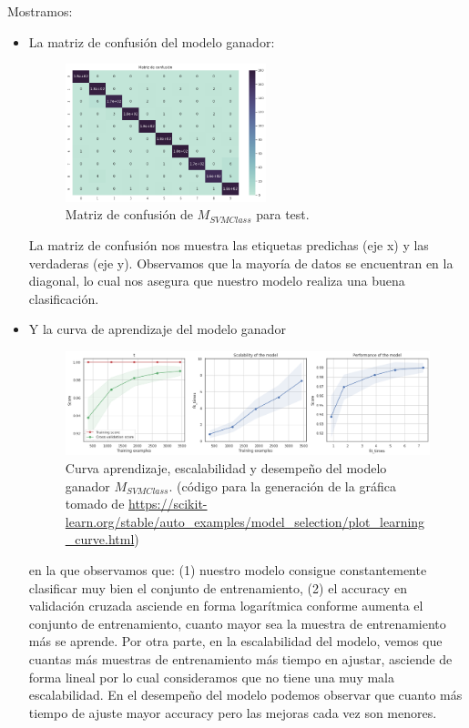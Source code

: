 \documentclass[11pt,a4paper]{article}
\theoremstyle{definition}
\begin{document}
	Mostramos:
	\begin{itemize}
	\item  La matriz de confusión del modelo ganador:
	\begin{figure}[H]
	\centering
	\includegraphics[width=0.55\textwidth]{images/confusion}
	\caption{Matriz de confusión de $M_{SVMClass}$ para test.}
	\end{figure}
	La matriz de confusión nos muestra las etiquetas predichas (eje x) y las verdaderas (eje y). Observamos que la mayoría de datos se encuentran en la diagonal, lo cual nos asegura que nuestro modelo realiza una buena clasificación.\\

	\item Y la curva de aprendizaje del modelo ganador 
	\begin{figure}[H]
	\centering
	\includegraphics[width=1\textwidth]{images/learning_curve}
	\caption{Curva aprendizaje, escalabilidad y desempeño del modelo ganador $M_{SVMClass}$. (código para la generación de la gráfica tomado de \url{https://scikit-learn.org/stable/auto_examples/model_selection/plot_learning_curve.html})}
	\end{figure}
	en la que observamos que: (1) nuestro modelo consigue constantemente clasificar muy bien el conjunto de entrenamiento, (2) el accuracy en validación cruzada asciende en forma logarítmica conforme aumenta el conjunto de entrenamiento, cuanto mayor sea la muestra de entrenamiento más se aprende. Por otra parte, en la escalabilidad del modelo, vemos que cuantas más muestras de entrenamiento más tiempo en ajustar, asciende de forma lineal por lo cual consideramos que no tiene una muy mala escalabilidad. En el desempeño del modelo podemos observar que cuanto más tiempo de ajuste mayor accuracy pero las mejoras cada vez son menores.
	\end{itemize}
	
\end{document}
